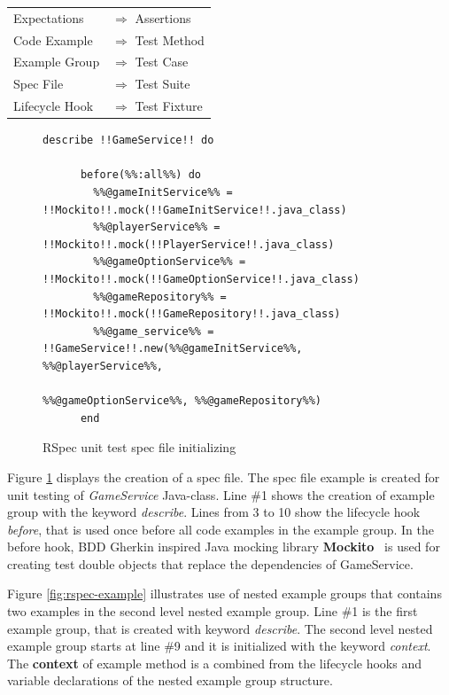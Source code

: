     \begin{longtable}{@{}p{}p{}@{}}
    Expectations & $\Longrightarrow$  \textrm{Assertions} \\
    Code Example & $\Longrightarrow$  \textrm{Test Method} \\
    Example Group & $\Longrightarrow$  \textrm{Test Case} \\
    Spec File & $\Longrightarrow$  \textrm{Test Suite} \\
    Lifecycle Hook & $\Longrightarrow$  \textrm{Test Fixture} \\
    \end{longtable}

    \begin{figure}[H]
        \begin{lstlisting}[style=ruby]
    describe !!GameService!! do

      before(%%:all%%) do
        %%@gameInitService%% = !!Mockito!!.mock(!!GameInitService!!.java_class)
        %%@playerService%% = !!Mockito!!.mock(!!PlayerService!!.java_class)
        %%@gameOptionService%% = !!Mockito!!.mock(!!GameOptionService!!.java_class)
        %%@gameRepository%% = !!Mockito!!.mock(!!GameRepository!!.java_class)
        %%@game_service%% = !!GameService!!.new(%%@gameInitService%%, %%@playerService%%,
                                           %%@gameOptionService%%, %%@gameRepository%%)
      end
        \end{lstlisting}
        \caption{RSpec unit test spec file initializing}
        \label{fig:rspec-init}
    \end{figure}

    Figure \ref{fig:rspec-init} displays the creation of a spec file. The spec file example is created for unit testing
    of \textit{GameService} Java-class. Line \#1 shows the creation of example group with the keyword \textit{describe}. Lines from
    3 to 10 show the lifecycle hook \textit{before}, that is used once before all code examples in the example group.
    In the before hook, BDD Gherkin inspired Java mocking library \textbf{Mockito}~\cite{mockito} is used for
    creating test double objects that replace the dependencies of GameService.

    Figure \ref{fig:rspec-example} illustrates use of nested example groups that contains two examples in the second
    level nested example group. Line \#1 is the first example group, that is created with keyword \textit{describe}. The second
    level nested example group starts at line \#9 and it is initialized with the keyword \textit{context}. The \textbf{context} of
    example method is a combined from the lifecycle hooks and variable declarations of the nested example group structure.

